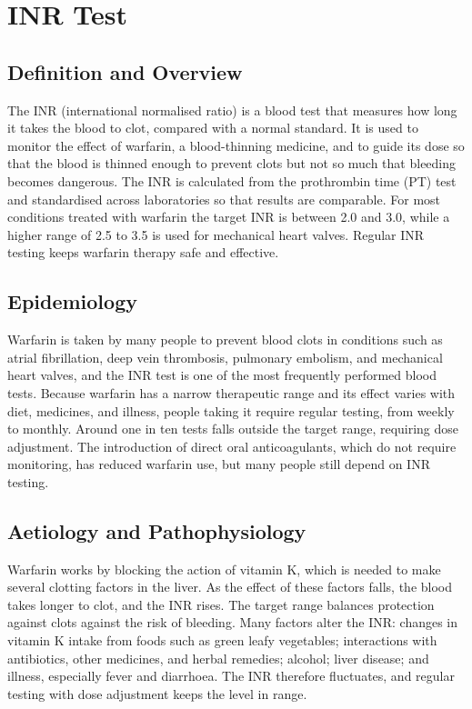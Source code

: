 \chapter{INR Test}

\section*{Definition and Overview}
The INR (international normalised ratio) is a blood test that measures how long it takes the blood to clot, compared with a normal standard. It is used to monitor the effect of warfarin, a blood-thinning medicine, and to guide its dose so that the blood is thinned enough to prevent clots but not so much that bleeding becomes dangerous. The INR is calculated from the prothrombin time (PT) test and standardised across laboratories so that results are comparable. For most conditions treated with warfarin the target INR is between 2.0 and 3.0, while a higher range of 2.5 to 3.5 is used for mechanical heart valves. Regular INR testing keeps warfarin therapy safe and effective.

\section*{Epidemiology}
Warfarin is taken by many people to prevent blood clots in conditions such as atrial fibrillation, deep vein thrombosis, pulmonary embolism, and mechanical heart valves, and the INR test is one of the most frequently performed blood tests. Because warfarin has a narrow therapeutic range and its effect varies with diet, medicines, and illness, people taking it require regular testing, from weekly to monthly. Around one in ten tests falls outside the target range, requiring dose adjustment. The introduction of direct oral anticoagulants, which do not require monitoring, has reduced warfarin use, but many people still depend on INR testing.

\section*{Aetiology and Pathophysiology}
Warfarin works by blocking the action of vitamin K, which is needed to make several clotting factors in the liver. As the effect of these factors falls, the blood takes longer to clot, and the INR rises. The target range balances protection against clots against the risk of bleeding. Many factors alter the INR: changes in vitamin K intake from foods such as green leafy vegetables; interactions with antibiotics, other medicines, and herbal remedies; alcohol; liver disease; and illness, especially fever and diarrhoea. The INR therefore fluctuates, and regular testing with dose adjustment keeps the level in range.

